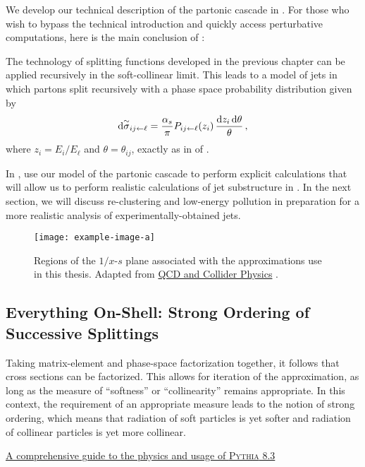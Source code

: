 We develop our technical description of the partonic cascade in .
%
For those who wish to bypass the technical introduction and quickly access perturbative computations, here is the main conclusion of :
\begin{answer}
    The technology of splitting functions developed in the previous chapter can be applied recursively in the soft-collinear limit.
    This leads to a model of jets in which partons split recursively with a phase space probability distribution given by
    \begin{align}
        \dd \overset{\sim}{\sigma}_{ij\leftarrow \ell}
        =
        \frac{\alpha_s}{\pi}
        P_{ij \leftarrow \ell}(z_i)\,\frac{\dd z_i \, \dd \theta}{\theta}
        \,,
    \end{align}
    where \(z_i = E_i / E_\ell\) and \(\theta = \theta_{ij}\), exactly as in  of .
\end{answer}
In , use our model of the partonic cascade to perform explicit calculations that will allow us to perform realistic calculations of jet substructure in .
%
In the next section, we will discuss re-clustering and low-energy pollution in preparation for a more realistic analysis of experimentally-obtained jets.



\begin{figure}[t!]
    \centering
    \texttt{[image: example-image-a]}
    \caption[
        Regions of the \(1/z\)-\(s\) plane associated with our approximations.
        Adapted from 
    ]
    {
        Regions of the \(1/x\)-\(s\) plane associated with the approximations use in this thesis.
        Adapted from \underline{QCD and Collider Physics} \cite{Collins:1984xc}.
    }
    \label{fig:dlla-plane}
\end{figure}


\subsection{Everything On-Shell: Strong Ordering of Successive Splittings}
\label{sec:everything-on-shell}

\epigraph{Taking matrix-element and phase-space factorization together, it follows that cross sections can be factorized. This allows for iteration of the approximation, as long as the measure of “softness” or “collinearity” remains appropriate. In this context, the requirement of an appropriate measure leads to the notion of strong ordering, which means that radiation of soft particles is yet softer and radiation of collinear particles is yet more collinear.}{\underline{A comprehensive guide to the physics and usage of \textsc{Pythia} 8.3} \cite{Bierlich:2022pfr}}

